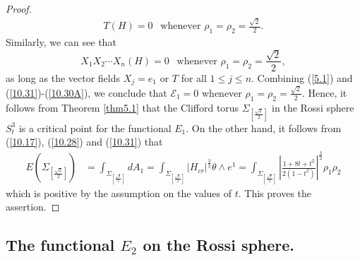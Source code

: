 \documentclass{amsart}
\theoremstyle{Corollary}
\numberwithin{equation}{section}
\begin{document}
\begin{proof}
\begin{equation}
\begin{split}
T(H)=0~~\mbox{ whenever }\rho_1=\rho_2=\frac{\sqrt{2}}{2}. 
\end{split}
\end{equation}
Similarly, we can see that 
\begin{equation}\label{10.30A}
X_1X_2\cdots X_n(H)=0~~\mbox{ whenever }\rho_1=\rho_2=\frac{\sqrt{2}}{2},
\end{equation}
as long as the vector fields $X_j=e_1$ or $T$ for all $1\leq j\leq n$. 
Combining 
(\ref{5.1}) and (\ref{10.31})-(\ref{10.30A}), we conclude that 
$\mathcal{E}_1=0$ 
whenever $\rho_1=\rho_2=\frac{\sqrt{2}}{2}$. 
Hence, it follows from Theorem \ref{thm5.1} that the Clifford torus
 $\Sigma_{[\frac{\sqrt{2}}{2}]}$ 
in the Rossi sphere $S^3_{t}$
is a critical point for the functional $E_1$. 
On the other hand, 
it follows from (\ref{10.17}), (\ref{10.28}) and (\ref{10.31})
that 
\begin{equation*}
\begin{split}
E(\Sigma_{[\frac{\sqrt{2}}{2}]})
&=\int_{\Sigma_{[\frac{\sqrt{2}}{2}]}}dA_1=\int_{\Sigma_{[\frac{\sqrt{2}}{2}]}}|H_{cr}|^{\frac{3}{2}}\theta\wedge e^1=\int_{\Sigma_{[\frac{\sqrt{2}}{2}]}}\left|\frac{1+8t+t^2}{2(1-t^2)}\right|^{\frac{3}{2}}\rho_1\rho_2
\end{split}
\end{equation*}
which is positive by the assumption on the values of $t$. 
This proves the assertion. 
\end{proof}







\subsection{The functional $E_2$ on the Rossi sphere.}
\end{document}
